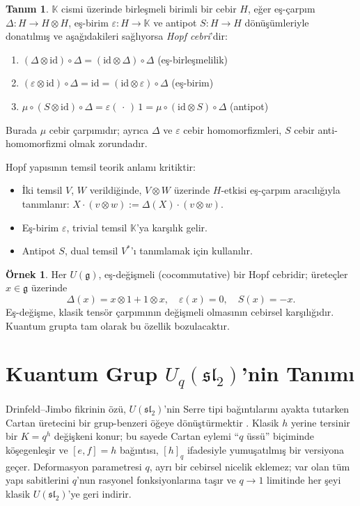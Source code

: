 \documentclass[10pt]{math}
\numberwithin{equation}{section}
\theoremstyle{plain}
\theoremstyle{definition}
\newtheorem{definition}[theorem]{Tanım}
\newtheorem{example}[theorem]{Örnek}
\renewcommand{\sl}{\mathfrak{sl}}
\newcommand{\gfrak}{\mathfrak{g}}
\newcommand{\Uq}{U_q(\sl_2)}
\newcommand{\K}{\mathbb{K}}
\newcommand{\id}{\mathrm{id}}
\newcommand{\eps}{\varepsilon}
\newcommand{\cop}{\Delta}
\newcommand{\qint}[1]{[#1]_q}
\begin{document}
\begin{definition}
$\K$ cismi üzerinde birleşmeli birimli bir cebir $H$, eğer eş-çarpım
$\cop : H \to H \otimes H$, eş-birim $\eps : H \to \K$ ve antipot
$S : H \to H$ dönüşümleriyle donatılmış ve aşağıdakileri sağlıyorsa
\emph{Hopf cebri}'dir:
\begin{enumerate}[leftmargin=*]
  \item $(\cop \otimes \id) \circ \cop = (\id \otimes \cop) \circ \cop$ \quad (eş-birleşmelilik)
  \item $(\eps \otimes \id) \circ \cop = \id = (\id \otimes \eps) \circ \cop$ \quad (eş-birim)
  \item $\mu \circ (S \otimes \id) \circ \cop = \eps(\,\cdot\,)\,1 = \mu \circ (\id \otimes S) \circ \cop$ \quad (antipot)
\end{enumerate}
Burada $\mu$ cebir çarpımıdır; ayrıca $\cop$ ve $\eps$ cebir homomorfizmleri,
$S$ cebir anti-homomorfizmi olmak zorundadır.
\end{definition}

Hopf yapısının temsil teorik anlamı kritiktir:
\begin{itemize}[leftmargin=*]
  \item İki temsil $V$, $W$ verildiğinde, $V \otimes W$ üzerinde $H$-etkisi
        eş-çarpım aracılığıyla tanımlanır: $X \cdot (v \otimes w) := \cop(X) \cdot (v \otimes w)$.
  \item Eş-birim $\eps$, trivial temsil $\K$'ya karşılık gelir.
  \item Antipot $S$, dual temsil $V^*$'ı tanımlamak için kullanılır.
\end{itemize}

\begin{example}
Her $U(\gfrak)$, eş-değişmeli (cocommutative) bir Hopf cebridir; üreteçler
$x \in \gfrak$ üzerinde
\[
  \cop(x) = x \otimes 1 + 1 \otimes x, \quad \eps(x) = 0, \quad S(x) = -x.
\]
Eş-değişme, klasik tensör çarpımının değişmeli olmasının cebirsel
karşılığıdır. Kuantum grupta tam olarak bu özellik bozulacaktır.
\end{example}

\section{Kuantum Grup $\Uq$'nin Tanımı}

Drinfeld--Jimbo fikrinin özü, $U(\sl_2)$'nin Serre tipi bağıntılarını ayakta
tutarken Cartan üretecini bir grup-benzeri öğeye dönüştürmektir
\cite{Drinfeld,Jimbo}. Klasik
$h$ yerine tersinir bir $K = q^h$ değişkeni konur; bu sayede Cartan eylemi
``$q$ üssü'' biçiminde köşegenleşir ve $[e,f]=h$ bağıntısı, $\qint{h}$
ifadesiyle yumuşatılmış bir versiyona geçer. Deformasyon parametresi $q$, ayrı
bir cebirsel nicelik eklemez; var olan tüm yapı sabitlerini $q$'nun rasyonel
fonksiyonlarına taşır ve $q\to 1$ limitinde her şeyi klasik $U(\sl_2)$'ye geri
indirir.
\end{document}
